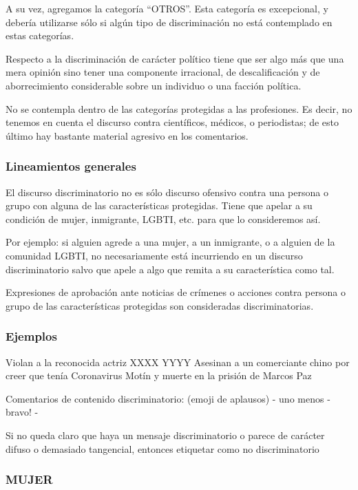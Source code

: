 A su vez, agregamos la categoría ``OTROS''. Esta categoría es excepcional, y debería utilizarse sólo si algún tipo de discriminación no está contemplado en estas categorías.

Respecto a la discriminación de carácter político tiene que ser algo más que una mera opinión  sino tener una componente irracional, de descalificación y de aborrecimiento considerable sobre un individuo o una facción política.

No se contempla dentro de las categorías protegidas a las profesiones. Es decir, no tenemos en cuenta el discurso contra científicos, médicos, o periodistas; de esto último hay bastante material agresivo en los comentarios.


\subsubsection{Lineamientos generales}

El discurso discriminatorio no es sólo discurso ofensivo contra una persona o grupo con alguna de las características protegidas. Tiene que apelar a su condición de mujer, inmigrante, LGBTI, etc. para que lo consideremos así.

Por ejemplo: si alguien agrede a una mujer, a un inmigrante, o a alguien de la comunidad LGBTI, no necesariamente está incurriendo en un discurso discriminatorio salvo que apele a algo que remita a su característica como tal.


Expresiones de aprobación ante noticias de crímenes o acciones contra persona o grupo de las características protegidas son consideradas discriminatorias.

\subsubsection{Ejemplos}

Violan a la reconocida actriz XXXX YYYY
Asesinan a un comerciante chino por creer que tenía Coronavirus
Motín y muerte en la prisión de Marcos Paz

Comentarios de contenido discriminatorio: (emoji de aplausos) - uno menos - bravo! -


Si no queda claro que haya un mensaje discriminatorio o parece de carácter difuso o demasiado tangencial, entonces etiquetar como no discriminatorio




\subsubsection{MUJER}

